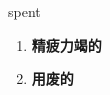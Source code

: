 
\begin{frame}
{\huge spent}
\begin{center}
\begin{enumerate}\Large
  \item \textbf{精疲力竭的}
  \item \textbf{用废的}
\end{enumerate}
\end{center}
\end{frame}
